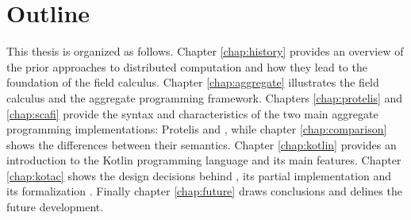 \section{Outline}
This thesis is organized as follows. Chapter \ref{chap:history} provides an overview of the prior approaches to distributed computation and how they lead to the foundation of the field calculus. Chapter \ref{chap:aggregate} illustrates the field calculus and the aggregate programming framework. Chapters \ref{chap:protelis} and \ref{chap:scafi} provide the syntax and characteristics of the two main aggregate programming implementations: Protelis and \Scafi{}, while chapter \ref{chap:comparison} shows the differences between their semantics. Chapter \ref{chap:kotlin} provides an introduction to the Kotlin programming language and its main features. Chapter \ref{chap:kotac} shows the design decisions behind \Kotac{}, its partial implementation and its formalization \FKotac{}. Finally chapter \ref{chap:future} draws conclusions and delines the future development.
